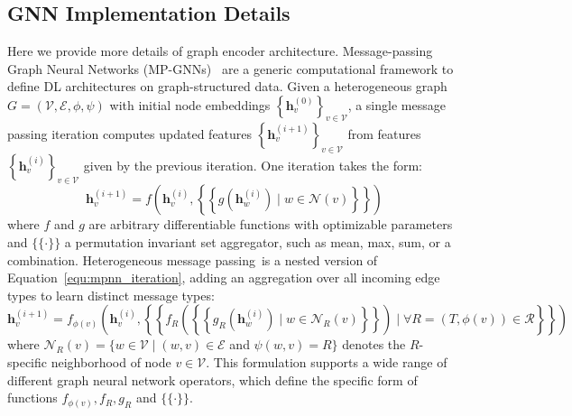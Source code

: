 \documentclass[11pt]{article}
\begin{document}
\subsection{GNN Implementation Details} 
Here we provide more details of graph encoder architecture. Message-passing Graph Neural Networks (MP-GNNs)~\citep{gilmer2017neural} are a generic computational framework to define DL architectures on graph-structured data. Given a heterogeneous graph $G=(\mathcal{V}, \mathcal{E}, \phi, \psi)$ with initial node embeddings $\left\{\mathbf{h}_v^{(0)}\right\}_{v \in \mathcal{V}}$, a single message passing iteration computes updated features $\left\{\mathbf{h}_v^{(i+1)}\right\}_{v \in \mathcal{V}}$ from features $\left\{\mathbf{h}_v^{(i)}\right\}_{v \in \mathcal{V}}$ given by the previous iteration. One iteration takes the form:
\begin{equation}
\label{equ:mpnn_iteration}
    \mathbf{h}_v^{(i+1)}=f\left(\mathbf{h}_v^{(i)},\left\{\left\{g\left(\mathbf{h}_w^{(i)}\right) \mid w \in \mathcal{N}(v)\right\}\right\}\right)
\end{equation}
where $f$ and $g$ are arbitrary differentiable functions with optimizable parameters and $\{\{\cdot\}\}$ a permutation invariant set aggregator, such as mean, max, sum, or a combination. Heterogeneous message passing~\citep{schlichtkrull2018modeling,hu2020heterogeneous}is a nested version of Equation~\ref{equ:mpnn_iteration}, adding an aggregation over all incoming edge types to learn distinct message types:
\begin{equation}
\mathbf{h}_v^{(i+1)}=f_{\phi(v)}\left(\mathbf{h}_v^{(i)},\left\{\left\{f_R\left(\left\{\left\{g_R\left(\mathbf{h}_w^{(i)}\right) \mid w \in \mathcal{N}_R(v)\right\}\right\}\right) \mid \forall R=(T, \phi(v)) \in \mathcal{R}\right\}\right\}\right)
\end{equation}
where $\mathcal{N}_R(v)=\{w \in \mathcal{V} \mid(w, v) \in \mathcal{E}$ and $\psi(w, v)=R\}$ denotes the $R$-specific neighborhood of node $v \in \mathcal{V}$. This formulation supports a wide range of different graph neural network operators, which define the specific form of functions $f_{\phi(v)}, f_R, g_R$ and $\{\{\cdot\}\}$.
\end{document}
